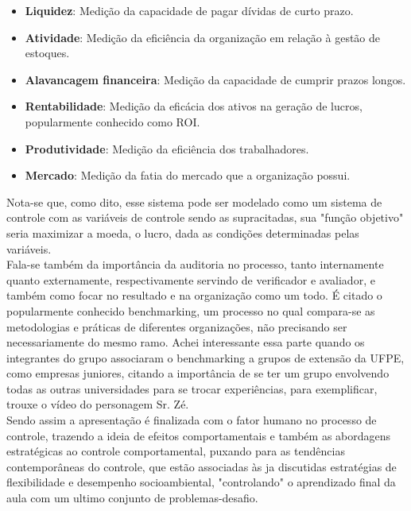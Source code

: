 \documentclass[oneside]{book}
\newcommand\tab[1][1cm]{\hspace*{#1}}
\theoremstyle{definition}
\begin{document}
            \begin{itemize}
                \item \textbf{Liquidez}: Medição da capacidade de pagar dívidas de curto prazo.
                \item \textbf{Atividade}: Medição da eficiência da organização em relação à gestão de estoques.
                \item \textbf{Alavancagem financeira}: Medição da capacidade de cumprir prazos longos.
                \item \textbf{Rentabilidade}: Medição da eficácia dos ativos na geração de lucros, popularmente conhecido como ROI.
                \item \textbf{Produtividade}: Medição da eficiência dos trabalhadores.
                \item \textbf{Mercado}: Medição da fatia do mercado que a organização possui.
            \end{itemize}
            \tab Nota-se que, como dito, esse sistema pode ser modelado como um sistema de controle com as variáveis de controle sendo as supracitadas, sua "função objetivo" seria maximizar a moeda, o lucro, dada as condições determinadas pelas variáveis.\\
            \tab Fala-se também da importância da auditoria no processo, tanto internamente quanto externamente, respectivamente servindo de verificador e avaliador, e também como focar no resultado e na organização como um todo. É citado o popularmente conhecido benchmarking, um processo no qual compara-se as metodologias e práticas de diferentes organizações, não precisando ser necessariamente do mesmo ramo. Achei interessante essa parte quando os integrantes do grupo associaram o benchmarking a grupos de extensão da UFPE, como empresas juniores, citando a importância de se ter um grupo envolvendo todas as outras universidades para se trocar experiências, para exemplificar, trouxe o vídeo do personagem Sr. Zé.\\
            \tab Sendo assim a apresentação é finalizada com o fator humano no processo de controle, trazendo a ideia de efeitos comportamentais e também as abordagens estratégicas ao controle comportamental, puxando para as tendências contemporâneas do controle, que estão associadas às ja discutidas estratégias de flexibilidade e desempenho socioambiental, "controlando" o aprendizado final da aula com um ultimo conjunto de problemas-desafio. 
             
\end{document}
